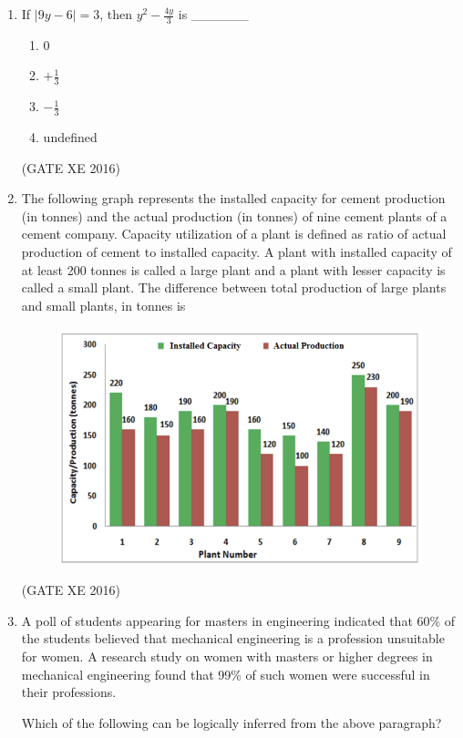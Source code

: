 \documentclass[12pt]{article}
\begin{document}
\begin{enumerate}
  \item If $|9y-6|=3$, then $y^2 - \frac{4y}{3}$ is \_\_\_\_\_\_
  \begin{multicols}{4}
  \begin{enumerate}
    \item 0
    \item $+\tfrac{1}{3}$
    \item $-\tfrac{1}{3}$
    \item undefined
  \end{enumerate}
  \end{multicols}
  (GATE XE 2016)

  \item The following graph represents the installed capacity for cement production (in tonnes) and the actual production (in tonnes) of nine cement plants of a cement company. Capacity utilization of a plant is defined as ratio of actual production of cement to installed capacity. A plant with installed capacity of at least 200 tonnes is called a large plant and a plant with lesser capacity is called a small plant. The difference between total production of large plants and small plants, in tonnes is

\begin{figure}[H]
    \centering
    \includegraphics[width=0.7\columnwidth]{figs/ass3_0_q6.png}
    \caption{}
    \label{fig:placeholder}
\end{figure}
(GATE XE 2016)

\item A poll of students appearing for masters in engineering indicated that 60\% of the students believed that mechanical engineering is a profession unsuitable for women. A research study on women with masters or higher degrees in mechanical engineering found that 99\% of such women were successful in their professions. 

Which of the following can be logically inferred from the above paragraph?


\end{enumerate}
\end{document}
